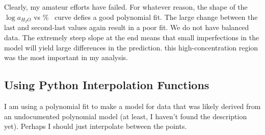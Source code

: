 \documentclass[]{tufte-handout}
\begin{document}
Clearly, my amateur efforts have failed. For whatever reason, the shape of the $\log{a_{H_2O}}$ vs \unit{\percent{}} curve defies a good polynomial fit. The large change between the last and second-last values again result in a poor fit. We do not have balanced data. The extremely steep slope at the end means that small imperfections in the model will yield large differences in the prediction. this high-concentration region was the most important in my analysis.

\clearpage

\subsection{Using Python Interpolation Functions}

I am using a polynomial fit to make a model for data that was likely derived from an undocumented polynomial model (at least, I haven't found the description yet). Perhaps I should just interpolate between the points.
\end{document}
